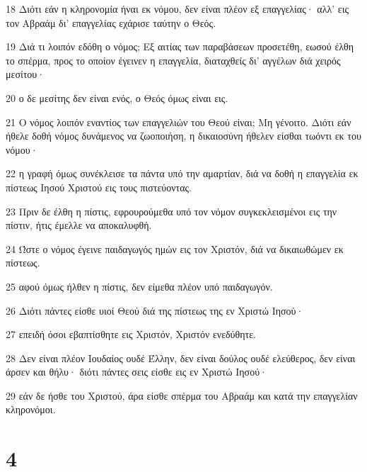 \par 18 Διότι εάν η κληρονομία ήναι εκ νόμου, δεν είναι πλέον εξ επαγγελίας· αλλ' εις τον Αβραάμ δι' επαγγελίας εχάρισε ταύτην ο Θεός.
\par 19 Διά τι λοιπόν εδόθη ο νόμος; Εξ αιτίας των παραβάσεων προσετέθη, εωσού έλθη το σπέρμα, προς το οποίον έγεινεν η επαγγελία, διαταχθείς δι' αγγέλων διά χειρός μεσίτου·
\par 20 ο δε μεσίτης δεν είναι ενός, ο Θεός όμως είναι εις.
\par 21 Ο νόμος λοιπόν εναντίος των επαγγελιών του Θεού είναι; Μη γένοιτο. Διότι εάν ήθελε δοθή νόμος δυνάμενος να ζωοποιήση, η δικαιοσύνη ήθελεν είσθαι τωόντι εκ του νόμου·
\par 22 η γραφή όμως συνέκλεισε τα πάντα υπό την αμαρτίαν, διά να δοθή η επαγγελία εκ πίστεως Ιησού Χριστού εις τους πιστεύοντας.
\par 23 Πριν δε έλθη η πίστις, εφρουρούμεθα υπό τον νόμον συγκεκλεισμένοι εις την πίστιν, ήτις έμελλε να αποκαλυφθή.
\par 24 Ώστε ο νόμος έγεινε παιδαγωγός ημών εις τον Χριστόν, διά να δικαιωθώμεν εκ πίστεως.
\par 25 αφού όμως ήλθεν η πίστις, δεν είμεθα πλέον υπό παιδαγωγόν.
\par 26 Διότι πάντες είσθε υιοί Θεού διά της πίστεως της εν Χριστώ Ιησού·
\par 27 επειδή όσοι εβαπτίσθητε εις Χριστόν, Χριστόν ενεδύθητε.
\par 28 Δεν είναι πλέον Ιουδαίος ουδέ Έλλην, δεν είναι δούλος ουδέ ελεύθερος, δεν είναι άρσεν και θήλυ· διότι πάντες σεις είσθε εις εν Χριστώ Ιησού·
\par 29 εάν δε ήσθε του Χριστού, άρα είσθε σπέρμα του Αβραάμ και κατά την επαγγελίαν κληρονόμοι.

\chapter{4}

